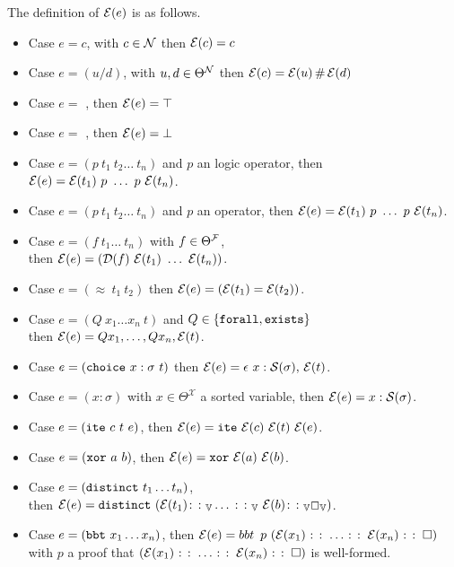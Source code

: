 \begin{definition}
The definition of $\E{e}$ is as follows.
\begin{itemize}
\setlength{\parskip}{0pt}
\item Case $e = c$, with $c \in \cal{N}$ then $\E{c} = c$
\item Case $e = (u \slash d)$, with $u,d \in \Theta^\cal{N}$ then $\E{c} = \E{u} \,\#\, \E{d}$
\item Case $e =$ , then $\E{e} = \top$
\item Case $e =$ , then $\E{e} = \bot$
\item Case $e = (p~t_1~t_2\dots~t_n)$ and $p$ an logic operator, then $\E{e} = \E{t_1}~p~\dots~p~\E{t_n}$.
\item Case $e = (p~t_1~t_2\dots~t_n)$ and $p$ an operator, then $\E{e} = \E{t_1}~p~\dots~p~\E{t_n}$.
\item Case $e = (f~t_1\dots~t_n)$ with $f \in \Theta^\cal{F}$,\\
  then $\E{e} = (\mathcal{D}(f)~\E{t_1}~\dots~\E{t_n})$.
\item Case $e = (\approx~t_1~t_2)$ then $\E{e} = (\E{t_1} = \E{t_2})$.
\item Case $e = (Q~x_1  \dots x_n ~t)$ and $Q\in \{\kw{forall}, \kw{exists}\}$\\
  then $\E{e} = Q x_1, \dots, Q x_n, \E{t}$. 
\item Case $e = (\kw{choice}~x : \sigma ~t)$ then $\E{e} = \epsilon~x: \cal{S}(\sigma),\, \E{t}$.
\item Case $e = (x: \sigma )$ with $x \in \Theta^\mathcal{X}$ a sorted variable, then $\E{e} = x: \cal{S}(\sigma)$.
\item Case $e = (\kw{ite}~c~t~e)$, then $\E{e} = \kw{ite}~\E{c}~\E{t}~\E{e}$.
\item Case $e = (\kw{xor}~a~b)$, then $\E{e} = \kw{xor}~\E{a}~\E{b}$.
\item Case $e = (\kw{distinct}~t_1 \dots t_n)$,\\
  then $\E{e} = \kw{distinct}~(\E{t_1} \colon\colon_\bb{V} \dots\, \colon\colon_\bb{V} ~\E{b} \colon\colon_\bb{V} \Box_\bb{V})$.
\item Case $e = (\kw{bbt}~x_1 \dots x_n)$, then $\E{e} = \mathop{bbt}~p~(\E{x_1} \mathbin{\colon\colon} \dots \mathbin{\colon\colon} \E{x_n} \mathbin{\colon\colon} \square)$
with $p$ a proof that \((\E{x_1} \mathbin{\colon\colon} \dots \mathbin{\colon\colon} \E{x_n} \mathbin{\colon\colon} \square)\) is well-formed.
\end{itemize}
\label{def:function-e}
\end{definition}

